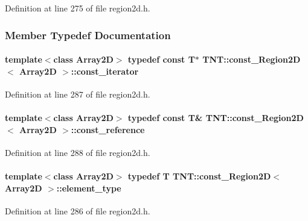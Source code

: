 Definition at line 275 of file region2d.h.



\subsubsection{Member Typedef Documentation}
\paragraph[{const\_\-iterator}]{\setlength{\rightskip}{0pt plus 5cm}template$<$class Array2D$>$ typedef const {\bf T}$\ast$ {\bf TNT::const\_\-Region2D}$<$ Array2D $>$::{\bf const\_\-iterator}}\hfill\label{class_t_n_t_1_1const___region2_d_a29156d91491356a5e974b18beb6e1099}


Definition at line 287 of file region2d.h.

\paragraph[{const\_\-reference}]{\setlength{\rightskip}{0pt plus 5cm}template$<$class Array2D$>$ typedef const {\bf T}\& {\bf TNT::const\_\-Region2D}$<$ Array2D $>$::{\bf const\_\-reference}}\hfill\label{class_t_n_t_1_1const___region2_d_a67192ca52bf5e121ef168e537ad06d5d}


Definition at line 288 of file region2d.h.

\paragraph[{element\_\-type}]{\setlength{\rightskip}{0pt plus 5cm}template$<$class Array2D$>$ typedef {\bf T} {\bf TNT::const\_\-Region2D}$<$ Array2D $>$::{\bf element\_\-type}}\hfill\label{class_t_n_t_1_1const___region2_d_ae63be5379f131ac76aa38c83d7527e9d}


Definition at line 286 of file region2d.h.

